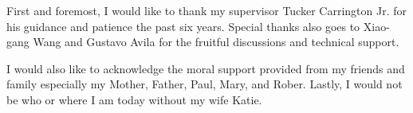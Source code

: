 





First and foremost, I would like to thank my supervisor Tucker Carrington Jr. for his guidance and patience the past six years.  Special thanks also goes to Xiao-gang Wang and Gustavo Avila for the fruitful discussions and technical support. 

I would also like to acknowledge the moral support provided from my friends and family especially my Mother, Father, Paul, Mary, and Rober. Lastly, I would not be who or where I am today without my wife Katie.  





\setlength{\abovedisplayskip}{3pt plus1pt minus1pt}
\setlength{\abovedisplayshortskip}{3pt plus1pt minus1pt}
\setlength{\belowdisplayskip}{3pt plus1pt minus1pt}
\setlength{\belowdisplayshortskip}{3pt plus1pt minus1pt}









